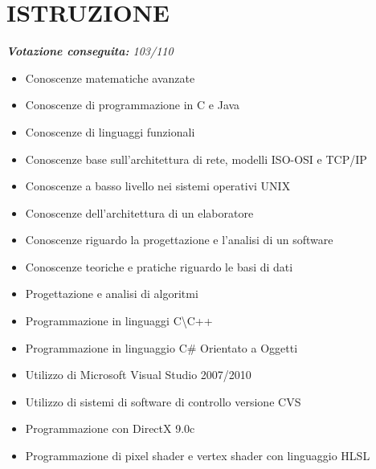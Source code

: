 \documentclass[11pt,a4paper,sans]{moderncv} %
\begin{document}

\section{ISTRUZIONE}
{
}


{
	\newline{}
	\textit{\textbf{Votazione conseguita:} 103/110}
}
{
	\begin{itemize}
		\item Conoscenze matematiche avanzate
		\item Conoscenze di programmazione in C e Java
		\item Conoscenze di linguaggi funzionali
		\item Conoscenze base sull'architettura di rete, modelli ISO-OSI e TCP/IP
		\item Conoscenze a basso livello nei sistemi operativi UNIX
		\item Conoscenze dell'architettura di un elaboratore
		\item Conoscenze riguardo la progettazione e l'analisi di un software
		\item Conoscenze teoriche e pratiche riguardo le basi di dati
		\item Progettazione e analisi di algoritmi
	\end{itemize}
}


{
	\begin{itemize}
		\item Programmazione in linguaggi C\textbackslash C++
		\item Programmazione in linguaggio C\# Orientato a Oggetti
		\item Utilizzo di Microsoft Visual Studio 2007/2010
		\item Utilizzo di sistemi di software di controllo versione CVS
		\item Programmazione con DirectX 9.0c
		\item Programmazione di pixel shader e vertex shader con linguaggio HLSL
	\end{itemize}
}
\end{document}
